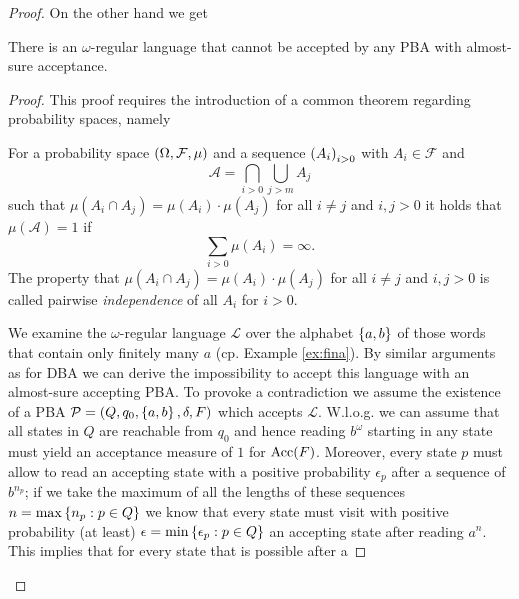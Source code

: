 \begin{proof}
  On the other hand we get
  \begin{lemma}
    \cite[Theorem 4.4.9 (b)]{Groesser}
    There is an $\omega$-regular language that cannot be accepted by any 
    \ac{PBA} with almost-sure acceptance.
  \end{lemma}
  \begin{proof}
    This proof requires the introduction of a common theorem regarding 
    probability spaces, namely
    \begin{theorem}
      \cite[Theorem 2.7]{Klenke}
      For a probability space $\left(\Omega, \mathcal{F}, \mu\right)$ and a sequence 
      $\left(A_{i}\right)_{i>0}$ with $A_{i}\in\mathcal{F}$ and
      \begin{equation*}
        \mathcal{A} = \bigcap_{i > 0}\bigcup_{j > m}A_{j}
      \end{equation*}
      such that $\mu(A_{i}\cap A_{j}) = \mu(A_{i})\cdot\mu(A_{j})$ for all 
      $i \neq j$ and $i,j > 0$ it holds that $\mu(\mathcal{A}) = 1$ if
      \begin{equation*}
        \sum\limits_{i>0}\mu(A_{i}) = \infty.
      \end{equation*}
      The property that $\mu(A_{i}\cap A_{j}) = \mu(A_{i})\cdot\mu(A_{j})$ for 
      all $i \neq j$ and $i,j > 0$ is called pairwise \emph{independence} of 
      all $A_{i}$ for $i > 0$.
      \label{thm:BorelCantelli}
    \end{theorem}
    We examine the $\omega$-regular language $\mathcal{L}$ over the alphabet
    $\left\{a,b\right\}$ of those words that contain only finitely many $a$ (cp. Example
    \ref{ex:fina}). By similar arguments as for \ac{DBA} we can derive the
    impossibility to accept this language with an almost-sure accepting 
    \ac{PBA}. To provoke a contradiction we assume the existence of a \ac{PBA}
    $\mathcal{P} = \left(Q, q_{0}, \left\{a,b\right\}, \delta, F\right)$ which accepts 
    $\mathcal{L}$. W.l.o.g. we can assume that all states in $Q$ are reachable
    from $q_{0}$ and hence reading $b^{\omega}$ starting in any state must 
    yield an acceptance measure of $1$ for $\operatorname{Acc}(F)$. Moreover, every state $p$ 
    must allow to read an accepting state with a positive probability 
    $\epsilon_{p}$ after a sequence of $b^{n_{p}}$; if we take the maximum of 
    all the lengths of these sequences $n = \max\left\{n_{p}:p\in Q\right\}$ we know 
    that every state must visit with positive probability (at least) 
    $\epsilon = \min\left\{\epsilon_{p}:p\in Q\right\}$ an accepting state after reading 
    $a^{n}$. This implies that for every state that is possible after a 

\end{proof}
\end{proof}
